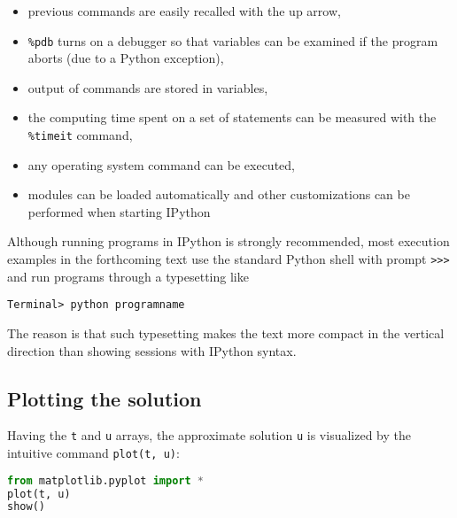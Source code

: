 \documentclass[graybox,sectrefs,envcountresetchap,open=right,final]{svmonodo}
\begin{document}
\begin{itemize}
 \item previous commands are easily recalled with the up arrow,

 \item \Verb!%

 \item output of commands are stored in variables,

 \item the computing time spent on a set of statements can be measured with the \Verb!%

 \item any operating system command can be executed,

 \item modules can be loaded automatically and other customizations can be performed when starting IPython
\end{itemize}

\noindent
Although running programs in IPython is strongly recommended, most
execution examples in the forthcoming text use the standard
Python shell with prompt \Verb!>>>! and run programs through
a typesetting like



\begin{Verbatim}[frame=lines,label=\fbox{{\tiny Terminal}},framesep=2.5mm,framerule=0.7pt,fontsize=\fontsize{9pt}{9pt}]
Terminal> python programname

\end{Verbatim}

The reason is that such typesetting
makes the text more compact in the vertical direction
than showing sessions with IPython syntax.

\label{decay:plotting}

\subsection{Plotting the solution}

Having the \texttt{t} and \texttt{u} arrays, the approximate solution \texttt{u} is visualized
by the intuitive command \texttt{plot(t, u)}:





\begin{lstlisting}[language=python,style=blue1_bluegreen]
from matplotlib.pyplot import *
plot(t, u)
show()

\end{lstlisting}
\end{document}
